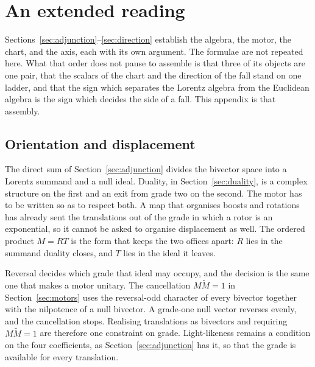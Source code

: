 \documentclass[a4paper]{article}
\begin{document}
\section{An extended reading}
\label{app:reading}

Sections~\ref{sec:adjunction}--\ref{sec:direction} establish the algebra, the motor, the chart, and the axis, each with its own argument. The formulae are not repeated here. What that order does not pause to assemble is that three of its objects are one pair, that the scalars of the chart and the direction of the fall stand on one ladder, and that the sign which separates the Lorentz algebra from the Euclidean algebra is the sign which decides the side of a fall. This appendix is that assembly.

\subsection{Orientation and displacement}

The direct sum of Section~\ref{sec:adjunction} divides the bivector space into a Lorentz summand and a null ideal. Duality, in Section~\ref{sec:duality}, is a complex structure on the first and an exit from grade two on the second. The motor has to be written so as to respect both. A map that organises boosts and rotations has already sent the translations out of the grade in which a rotor is an exponential, so it cannot be asked to organise displacement as well. The ordered product \(M=RT\) is the form that keeps the two offices apart: \(R\) lies in the summand duality closes, and \(T\) lies in the ideal it leaves.

Reversal decides which grade that ideal may occupy, and the decision is the same one that makes a motor unitary. The cancellation \(M\widetilde{M}=1\) in Section~\ref{sec:motors} uses the reversal-odd character of every bivector together with the nilpotence of a null bivector. A grade-one null vector reverses evenly, and the cancellation stops. Realising translations as bivectors and requiring \(M\widetilde{M}=1\) are therefore one constraint on grade. Light-likeness remains a condition on the four coefficients, as Section~\ref{sec:adjunction} has it, so that the grade is available for every translation.
\end{document}
